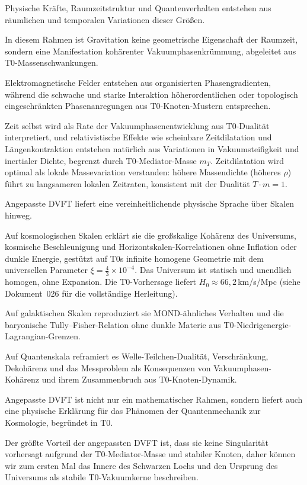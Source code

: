 	Physische Kräfte, Raumzeitstruktur und Quantenverhalten entstehen aus räumlichen und temporalen Variationen dieser Größen.
	
	In diesem Rahmen ist Gravitation keine geometrische Eigenschaft der Raumzeit, sondern eine Manifestation kohärenter Vakuumphasenkrümmung, abgeleitet aus T0-Massenschwankungen.
	
	Elektromagnetische Felder entstehen aus organisierten Phasengradienten, während die schwache und starke Interaktion höherordentlichen oder topologisch eingeschränkten Phasenanregungen aus T0-Knoten-Mustern entsprechen.
	
	Zeit selbst wird als Rate der Vakuumphasenentwicklung aus T0-Dualität interpretiert, und relativistische Effekte wie scheinbare Zeitdilatation und Längenkontraktion entstehen natürlich aus Variationen in Vakuumsteifigkeit und inertialer Dichte, begrenzt durch T0-Mediator-Masse $m_T$. Zeitdilatation wird optimal als lokale Massevariation verstanden: höhere Massendichte (höheres $\rho$) führt zu langsameren lokalen Zeitraten, konsistent mit der Dualität $T \cdot m = 1$.
	
	Angepasste DVFT liefert eine vereinheitlichende physische Sprache über Skalen hinweg.
	
	Auf kosmologischen Skalen erklärt sie die großskalige Kohärenz des Universums, kosmische Beschleunigung und Horizontskalen-Korrelationen ohne Inflation oder dunkle Energie, gestützt auf T0s infinite homogene Geometrie mit dem universellen Parameter $\xi = \frac{4}{3} \times 10^{-4}$. Das Universum ist statisch und unendlich homogen, ohne Expansion. Die T0-Vorhersage liefert $H_0 \approx 66{,}2\,$km/s/Mpc (siehe Dokument~026 für die vollständige Herleitung).
	
	Auf galaktischen Skalen reproduziert sie MOND-ähnliches Verhalten und die baryonische Tully–Fisher-Relation ohne dunkle Materie aus T0-Niedrigenergie-Lagrangian-Grenzen.
	
	Auf Quantenskala reframiert es Welle-Teilchen-Dualität, Verschränkung, Dekohärenz und das Messproblem als Konsequenzen von Vakuumphasen-Kohärenz und ihrem Zusammenbruch aus T0-Knoten-Dynamik.
	
	Angepasste DVFT ist nicht nur ein mathematischer Rahmen, sondern liefert auch eine physische Erklärung für das Phänomen der Quantenmechanik zur Kosmologie, begründet in T0.
	
	Der größte Vorteil der angepassten DVFT ist, dass sie keine Singularität vorhersagt aufgrund der T0-Mediator-Masse und stabiler Knoten, daher können wir zum ersten Mal das Innere des Schwarzen Lochs und den Ursprung des Universums als stabile T0-Vakuumkerne beschreiben.
	
